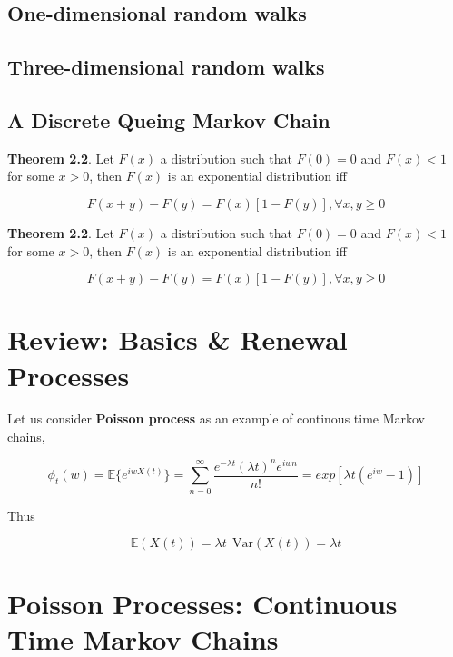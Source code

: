 \documentclass[12pt]{article}
\theoremstyle{nonumberbreak}
\begin{document}
\subsection{One-dimensional random walks}




\subsection{Three-dimensional random walks}



\subsection{A Discrete Queing Markov Chain}




\begin{theorem}
\textbf{Theorem 2.2}. Let $F(x)$ a distribution such that $F(0) = 0$ and $F(x) < 1$ for some $x >0 $, then $F(x)$ is an exponential distribution iff

$$
F(x+y) - F(y) = F(x)[1-F(y)], \forall x,y \ge 0
$$
\end{theorem}


\begin{theorem}
\textbf{Theorem 2.2}. Let $F(x)$ a distribution such that $F(0) = 0$ and $F(x) < 1$ for some $x >0 $, then $F(x)$ is an exponential distribution iff

$$
F(x+y) - F(y) = F(x)[1-F(y)], \forall x,y \ge 0
$$
\end{theorem}



\section{Review: Basics \& Renewal Processes}



Let us consider \textbf{Poisson process} as an example of continous time Markov chains,

$$
\phi_t (w) = \mathbb{E} \{ e^{iwX(t)} \} = \sum_{n=0}^\infty \frac{e^{-\lambda t} (\lambda t)^n e^{iwn}}{n!} = exp[\lambda t (e^{iw} -1)]
$$

Thus 

$$
\mathbb{E} (X(t)) = \lambda t \ \ \mathrm{Var}(X(t)) = \lambda t
$$


\section{Poisson Processes: Continuous Time Markov Chains}
\end{document}
